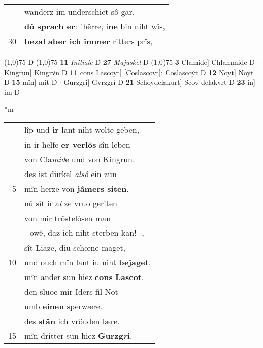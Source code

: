 \documentclass[8pt,a4paper,notitlepage]{article}
\begin{document}
\begin{table}[ht]
\begin{minipage}[t]{0.5\linewidth}
\begin{tabular}{rl}
 & wanderz im underschiet sô gar.\\ 
 & \textbf{dô sprach er}: "hêrre, i\textbf{ne} bin niht wîs,\\ 
30 & \textbf{bezal} \textbf{aber ich} \textbf{immer} ritters prîs,\\ 
\end{tabular}
\scriptsize
\line(1,0){75} \newline
D \newline
\line(1,0){75} \newline
\textbf{11} \textit{Initiale} D  \textbf{27} \textit{Majuskel} D  \newline
\line(1,0){75} \newline
\textbf{3} Clamide] Chlammide D  $\cdot$ Kingrun] Kingrvͦn D \textbf{11} cons Lascoyt] [Coslascovt]: Coslascoẏt D \textbf{12} Noyt] Noẏt D \textbf{15} mîn] mit D  $\cdot$ Gurzgri] Gvrzgrî D \textbf{21} Schoydelakurt] Scoy delakvrt D \textbf{23} in] im D \newline
\end{minipage}
\hspace{0.5cm}
\begin{minipage}[t]{0.5\linewidth}
\small
\begin{center}*m
\end{center}
\begin{tabular}{rl}
 & lîp und \textbf{ir} lant niht wolte geben,\\ 
 & in ir helfe \textbf{er verlôs} sîn leben\\ 
 & von Cla\textit{mid}e und von Kingrun.\\ 
 & des ist dürkel \textit{alsô} ein zûn\\ 
5 & mîn herze von \textbf{jâmers siten}.\\ 
 & nû sît ir a\textit{l} ze vruo geriten\\ 
 & von mir trôstelôsen man\\ 
 & - owê, daz ich niht sterben kan! -,\\ 
 & sît Liaze, diu schœne maget,\\ 
10 & und ouch mîn lant iu niht \textbf{bejaget}.\\ 
 & mîn ander sun hiez \textbf{cons} \textbf{Lascot}.\\ 
 & den sluoc mir Iders fil Not\\ 
 & umb \textbf{einen} sperwære.\\ 
 & des \textbf{stân} ich vröuden lære.\\ 
15 & mîn dritter sun hiez \textbf{Gurzg\textit{r}i}.\\ 

\end{tabular}
\end{minipage}
\end{table}
\end{document}
